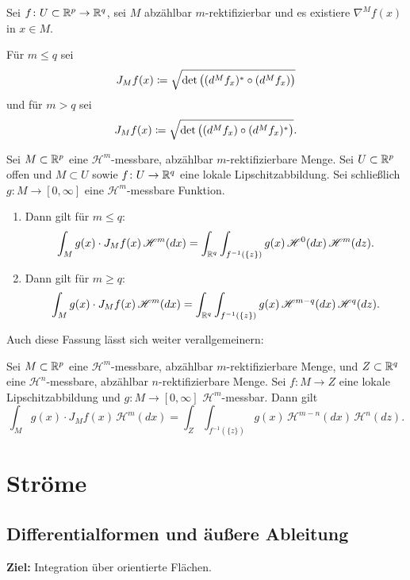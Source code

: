 \documentclass[a4paper,twoside,DIV15,BCOR12mm]{scrbook}
\newcommand{\HM}{\mathscr H}
\begin{document}
\begin{definition}
Sei $f\colon U\subset\mathbb{R}^p \to \mathbb{R}^q$, sei $M$ abzählbar $m$-rektifizierbar und es existiere $\nabla^M f(x)$  in $x\in M$. 

Für $m\le q$ sei
\[
J_M f(x) \da \sqrt{\det \big( (d^Mf_x)^*\circ (d^Mf_x)\big)}
\]
und für $m> q$ sei 
\[
J_M f(x) \da \sqrt{\det \big( (d^Mf_x)\circ (d^Mf_x)^*\big)}.
\]
\end{definition}

\begin{satz}
Sei $M\subset\mathbb{R}^p$ eine $\HM^m$-messbare, abzählbar $m$-rektifizierbare Menge. Sei $U\subset \mathbb{R}^p$ offen und $M\subset U$ sowie $f\colon U\to\mathbb{R}^q$ eine lokale Lipschitzabbildung. Sei schließlich $g\colon M \to [0,\infty]$ eine $\HM^m$-messbare Funktion. 
\begin{enumerate}[\quad(a)]
\item Dann gilt für $m\le q$:
\[
\int_M g(x) \cdot J_Mf(x)\, \HM^m(dx) =
\int_{\MdR^q} \int_{f^{-1}(\{z\})} g(x)\, \HM^0(dx)\, \HM^m(dz).
\]
\item Dann gilt für $m\ge q$:
\[
\int_M g(x) \cdot J_Mf(x)\, \HM^m(dx) =
\int_{\MdR^q} \int_{f^{-1}(\{z\})} g(x)\, \HM^{m-q}(dx)\, \HM^q(dz).
\]
\end{enumerate}
\end{satz}

\pagebreak[1]
Auch diese Fassung lässt sich weiter verallgemeinern:
\begin{satz}
Sei $M\subset\mathbb{R}^p$ eine $\HM^m$-messbare, abzählbar $m$-rektifizierbare Menge, und $Z\subset\mathbb{R}^q$ eine $\HM^n$-messbare, abzählbar $n$-rektifizierbare Menge. Sei $f\colon M\to Z$ eine lokale Lipschitzabbildung und $g:M\to [0,\infty]$ $\HM^m$-messbar. Dann gilt
\[
\int_M g(x) \cdot J_Mf(x) \, \HM^m(dx) = \int_Z \int_{f^{-1}(\{z\})} g(x)\, \HM^{m-n}(dx)\, \HM^n(dz).
\]
\end{satz}

\chapter{Ströme}

\section{Differentialformen und äußere Ableitung}

\textbf{Ziel:} Integration über orientierte Flächen.
\end{document}

